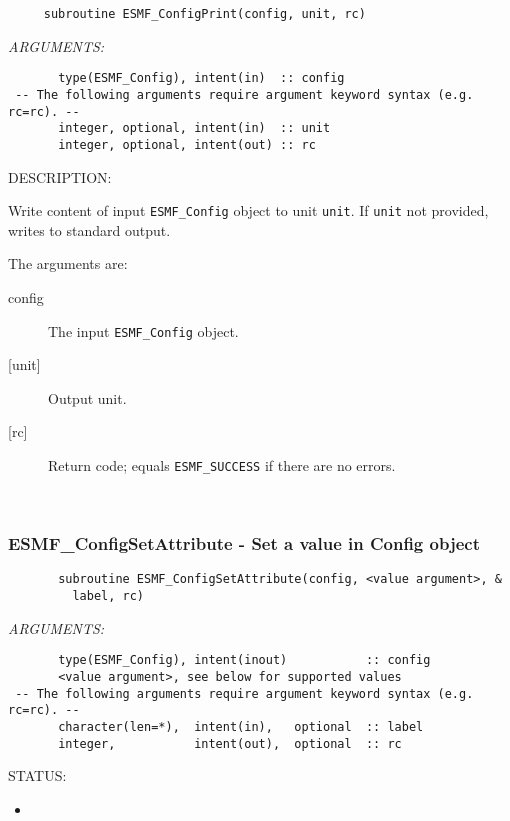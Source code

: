  
\begin{verbatim}     subroutine ESMF_ConfigPrint(config, unit, rc)
 \end{verbatim}{\em ARGUMENTS:}
\begin{verbatim}       type(ESMF_Config), intent(in)  :: config
 -- The following arguments require argument keyword syntax (e.g. rc=rc). --
       integer, optional, intent(in)  :: unit
       integer, optional, intent(out) :: rc\end{verbatim}
{\sf DESCRIPTION:\\ }


     Write content of input {\tt ESMF\_Config} object to unit {\tt unit}.
     If {\tt unit} not provided, writes to standard output.
  
     The arguments are:
     \begin{description}
       \item[config]
         The input {\tt ESMF\_Config} object.
       \item[{[unit]}]
         Output unit.
       \item [{[rc]}]
         Return code; equals {\tt ESMF\_SUCCESS} if there are no errors.
     \end{description}
   
 
\mbox{}\hrulefill\ 
 

  \subsubsection [ESMF\_ConfigSetAttribute] {ESMF\_ConfigSetAttribute - Set a value in Config object}


  
  
\begin{verbatim}       subroutine ESMF_ConfigSetAttribute(config, <value argument>, &
         label, rc)\end{verbatim}{\em ARGUMENTS:}
\begin{verbatim}       type(ESMF_Config), intent(inout)           :: config     
       <value argument>, see below for supported values
 -- The following arguments require argument keyword syntax (e.g. rc=rc). --
       character(len=*),  intent(in),   optional  :: label 
       integer,           intent(out),  optional  :: rc   \end{verbatim}
{\sf STATUS:}
   \begin{itemize}
   \item{}
   \end{itemize}
  
